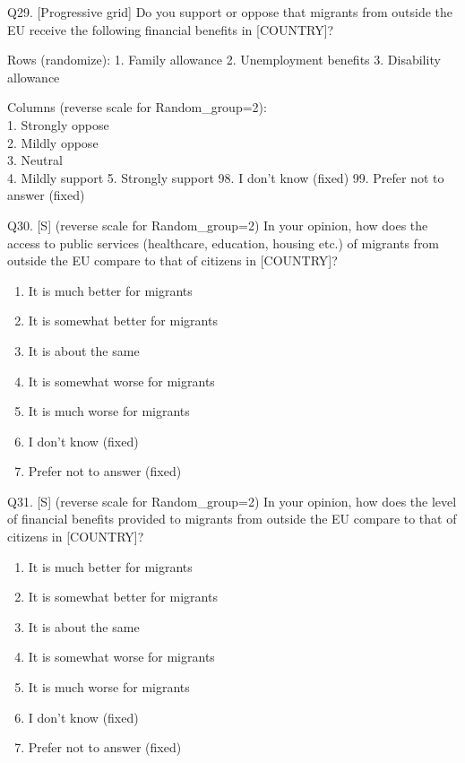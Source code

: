 \documentclass[
  12pt,
  a4paper,
]{article}
\providecommand{\tightlist}{%
  \setlength{\itemsep}{0pt}\setlength{\parskip}{0pt}}
\begin{document}
Q29. {[}Progressive grid{]} Do you support or oppose that migrants from outside the EU receive the following financial benefits in {[}COUNTRY{]}?

Rows (randomize):
1. Family allowance
2. Unemployment benefits
3. Disability allowance

Columns (reverse scale for Random\_group=2):\\
1. Strongly oppose\\
2. Mildly oppose\\
3. Neutral\\
4. Mildly support
5. Strongly support
98. I don't know (fixed)
99. Prefer not to answer (fixed)

Q30. {[}S{]} (reverse scale for Random\_group=2) In your opinion, how does the access to public services (healthcare, education, housing etc.) of migrants from outside the EU compare to that of citizens in {[}COUNTRY{]}?

\begin{enumerate}
\def\labelenumi{\arabic{enumi}.}
\tightlist
\item
  It is much better for migrants
\item
  It is somewhat better for migrants
\item
  It is about the same
\item
  It is somewhat worse for migrants
\item
  It is much worse for migrants
\item
  I don't know (fixed)
\item
  Prefer not to answer (fixed)
\end{enumerate}

Q31. {[}S{]} (reverse scale for Random\_group=2) In your opinion, how does the level of financial benefits provided to migrants from outside the EU compare to that of citizens in {[}COUNTRY{]}?

\begin{enumerate}
\def\labelenumi{\arabic{enumi}.}
\tightlist
\item
  It is much better for migrants\\
\item
  It is somewhat better for migrants\\
\item
  It is about the same
\item
  It is somewhat worse for migrants\\
\item
  It is much worse for migrants
\item
  I don't know (fixed)
\item
  Prefer not to answer (fixed)
\end{enumerate}
\end{document}
